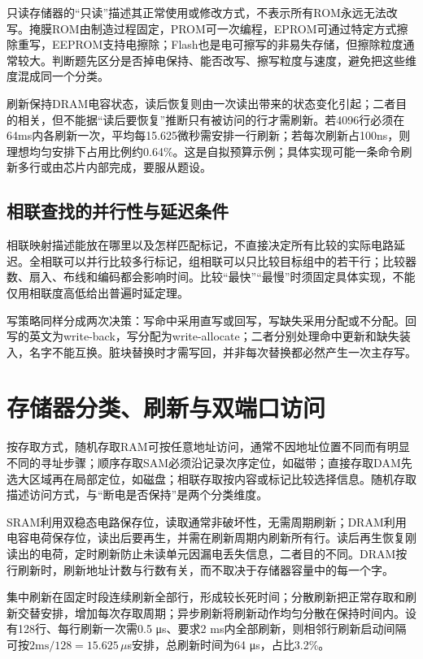 只读存储器的``只读''描述其正常使用或修改方式，不表示所有ROM永远无法改写。掩膜ROM由制造过程固定，PROM可一次编程，EPROM可通过特定方式擦除重写，EEPROM支持电擦除；Flash也是电可擦写的非易失存储，但擦除粒度通常较大。判断题先区分是否掉电保持、能否改写、擦写粒度与速度，避免把这些维度混成同一个分类。

刷新保持DRAM电容状态，读后恢复则由一次读出带来的状态变化引起；二者目的相关，但不能据``读后要恢复''推断只有被访问的行才需刷新。若4096行必须在64ms内各刷新一次，平均每15.625微秒需安排一行刷新；若每次刷新占100ns，则理想均匀安排下占用比例约0.64\%。这是自拟预算示例；具体实现可能一条命令刷新多行或由芯片内部完成，要服从题设。

\subsection{相联查找的并行性与延迟条件}\label{CO03-assoc}

相联映射描述能放在哪里以及怎样匹配标记，不直接决定所有比较的实际电路延迟。全相联可以并行比较多行标记，组相联可以只比较目标组中的若干行；比较器数、扇入、布线和编码都会影响时间。比较``最快''``最慢''时须固定具体实现，不能仅用相联度高低给出普遍时延定理。

写策略同样分成两次决策：写命中采用直写或回写，写缺失采用分配或不分配。回写的英文为write-back，写分配为write-allocate；二者分别处理命中更新和缺失装入，名字不能互换。脏块替换时才需写回，并非每次替换都必然产生一次主存写。

\section{存储器分类、刷新与双端口访问}\label{CO03-storage-details}

按存取方式，随机存取RAM可按任意地址访问，通常不因地址位置不同而有明显不同的寻址步骤；顺序存取SAM必须沿记录次序定位，如磁带；直接存取DAM先选大区域再在局部定位，如磁盘；相联存取按内容或标记比较选择信息。随机存取描述访问方式，与``断电是否保持''是两个分类维度。

SRAM利用双稳态电路保存位，读取通常非破坏性，无需周期刷新；DRAM利用电容电荷保存位，读出后要再生，并需在刷新周期内刷新所有行。读后再生恢复刚读出的电荷，定时刷新防止未读单元因漏电丢失信息，二者目的不同。DRAM按行刷新时，刷新地址计数与行数有关，而不取决于存储器容量中的每一个字。

集中刷新在固定时段连续刷新全部行，形成较长死时间；分散刷新把正常存取和刷新交替安排，增加每次存取周期；异步刷新将刷新动作均匀分散在保持时间内。设有128行、每行刷新一次需0.5 μs、要求2 ms内全部刷新，则相邻行刷新启动间隔可按\(2\mathrm{ms}/128=15.625\,\mu\)s安排，总刷新时间为64 μs，占比3.2\%。

